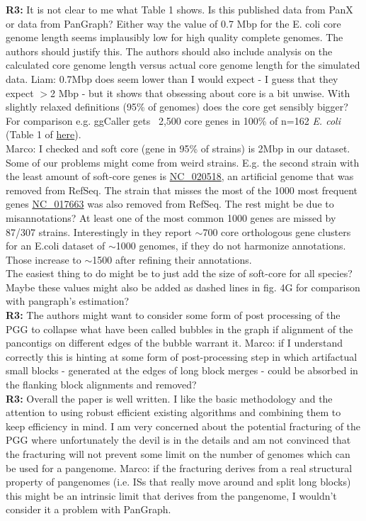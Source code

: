 \documentclass[aps,rmp,onecolumn]{revtex4-1}
\newcommand{\Marco}[1]{{\color{gray}Marco: #1}}
\newcommand{\Liam}[1]{{\color{teal}Liam: #1}}
\newcommand{\reviewer}[2]{\textbf{#1:} #2\vskip 5mm}
\begin{document}
\reviewer{R3}{It is not clear to me what Table 1 shows. Is this published data from PanX or data from PanGraph? Either way the value of 0.7 Mbp for the E. coli core genome length seems implausibly low for high quality complete genomes. The authors should justify this. The authors should also include analysis on the calculated core genome length versus actual core genome length for the simulated data.}
\Liam{0.7Mbp does seem lower than I would expect - I guess that they expect $>$2 Mbp - but it shows that obsessing about core is a bit unwise. With slightly relaxed definitions (95\% of genomes) does the core get sensibly bigger? For comparison e.g. ggCaller gets ~2,500 core genes in 100\% of n=162 \textit{E. coli} (Table 1 of \href{https://www.biorxiv.org/content/10.1101/2023.01.24.524926v1.full.pdf}{here}).}\\
\Marco{I checked and soft core (gene in 95\% of strains) is 2Mbp in our dataset. Some of our problems might come from weird strains. E.g. the second strain with the least amount of soft-core genes is \href{https://www.ncbi.nlm.nih.gov/nuccore/NC_020518.1?report=genbank}{NC\_020518}, an artificial genome that was removed from RefSeq. The strain that misses the most of the 1000 most frequent genes \href{https://www.ncbi.nlm.nih.gov/nuccore/NC_017663.1?report=genbank}{NC\_017663} was also removed from RefSeq. The rest might be due to misannotations? At least one of the most common 1000 genes are missed by 87/307 strains. Interestingly in \cite{sutton2021pan} they report $\sim$700 core orthologous gene clusters for an E.coli dataset of $\sim$1000 genomes, if they do not harmonize annotations. Those increase to $\sim$1500 after refining their annotations.\\
      The easiest thing to do might be to just add the size of soft-core for all species? Maybe these values might also be added as dashed lines in fig. 4G for comparison with pangraph's estimation?}\\

\reviewer{R3}{The authors might want to consider some form of post processing of the PGG to collapse what have been called bubbles in the graph if alignment of the pancontigs on different edges of the bubble warrant it.}
\Marco{if I understand correctly this is hinting at some form of post-processing step in which artifactual small blocks - generated at the edges of long block merges - could be absorbed in the flanking block alignments and removed?}\\

\reviewer{R3}{Overall the paper is well written. I like the basic methodology and the attention to using robust efficient existing algorithms and combining them to keep efficiency in mind. I am very concerned about the potential fracturing of the PGG where unfortunately the devil is in the details and am not convinced that the fracturing will not prevent some limit on the number of genomes which can be used for a pangenome.}
\Marco{if the fracturing derives from a real structural property of pangenomes (i.e. ISs that really move around and split long blocks) this might be an intrinsic limit that derives from the pangenome, I wouldn't consider it a problem with PanGraph.}\\
\end{document}
